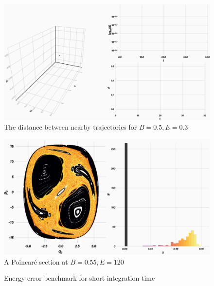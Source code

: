 \documentclass{beamer}
\begin{document}
\begin{frame}
	\begin{figure}
		\includegraphics[width=\textwidth]{dist-with-log}
		\caption{The distance between nearby trajectories for \(B=0.5, E=0.3\)}
	\end{figure}
\end{frame}


\begin{frame}
	\begin{figure}
		\includegraphics[width=\textwidth]{poincare}
		\caption{A Poincaré section at \(B=0.55, E=120\)}
	\end{figure}
\end{frame}


\begin{frame}
	\begin{figure}
		
		\caption{Energy error benchmark for short integration time}
	\end{figure}
\end{frame}
\end{document}
